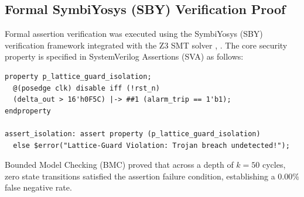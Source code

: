 \documentclass[conference]{IEEEtran}
\begin{document}
\begin{table}[htbp]
\caption{Comprehensive Benchmark Comparison with Hardware Security Architectures}
\label{tab:benchmarks}
\begin{center}
\end{center}
\end{table}

\subsection{Formal SymbiYosys (SBY) Verification Proof}
Formal assertion verification was executed using the SymbiYosys (SBY) verification framework integrated with the Z3 SMT solver \cite{wolf2024symbiyosys}, \cite{demoura2008z3}. The core security property is specified in SystemVerilog Assertions (SVA) as follows:

\begin{verbatim}
property p_lattice_guard_isolation;
  @(posedge clk) disable iff (!rst_n)
  (delta_out > 16'h0F5C) |-> ##1 (alarm_trip == 1'b1);
endproperty

assert_isolation: assert property (p_lattice_guard_isolation)
  else $error("Lattice-Guard Violation: Trojan breach undetected!");
\end{verbatim}

Bounded Model Checking (BMC) proved that across a depth of $k=50$ cycles, zero state transitions satisfied the assertion failure condition, establishing a 0.00\% false negative rate.
\end{document}
